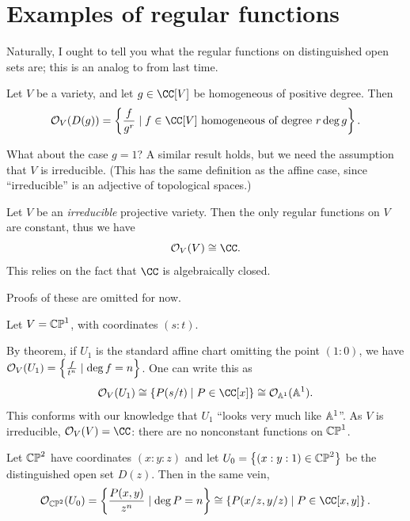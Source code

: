 \documentclass[11pt]{scrreprt}
\begin{document}
\section{Examples of regular functions}
Naturally, I ought to tell you what the regular functions
on distinguished open sets are; this is an analog to
 from last time.
\begin{theorem}
	Let $V$ be a variety, and let $g \in \CC[V]$ be homogeneous
	of positive degree.
	Then
	\[
		\OO_V(D(g))
		= \left\{ \frac{f}{g^r} \mid
		f \in \CC[V] \text{ homogeneous of degree $r\deg g$}
		\right\}.
	\]
\end{theorem}
What about the case $g = 1$?
A similar result holds, but we need the assumption that $V$ is irreducible.
(This has the same definition as the affine case,
since ``irreducible'' is an adjective of topological spaces.)
\begin{theorem}
	Let $V$ be an \emph{irreducible} projective variety.
	Then the only regular functions on $V$ are constant,
	thus we have \[ \OO_V(V) \cong \CC. \]
	This relies on the fact that $\CC$ is algebraically closed.
\end{theorem}
Proofs of these are omitted for now.
\begin{example}
	Let $V = \mathbb{CP}^1$, with coordinates $(s:t)$.
	\begin{enumerate}[(a)]
		\ii By theorem, if $U_1$ is the standard affine chart
		omitting the point $(1:0)$, we have
		$ \mathcal O_V(U_1) = \left\{ \frac{f}{t^n} \mid \deg f = n \right\} $.
		One can write this as
		\[ \OO_V(U_1) \cong \left\{ P(s/t) \mid P \in \CC[x] \right\}
			\cong \OO_{\Aff^1} (\Aff^1). \]
		This conforms with our knowledge that $U_1$
		``looks very much like $\mathbb A^1$''.
		\ii As $V$ is irreducible, $\OO_V(V) = \CC$:
		there are no nonconstant functions on $\mathbb{CP}^1$.
	\end{enumerate}
\end{example}

\begin{example}
	Let $\mathbb{CP}^2$ have coordinates $(x:y:z)$ and 
	let $U_0 = \left\{ (x:y:1) \in \mathbb{CP}^2 \right\}$
	be the distinguished open set $D(z)$.
	Then in the same vein,
	\[
		\OO_{\CP^2}(U_0)
		= \left\{ \frac{P(x,y)}{z^n} \mid \deg P = n \right\}
		\cong \left\{ P(x/z, y/z) \mid P \in \CC[x,y] \right\}.
	\]
\end{example}
\end{document}
